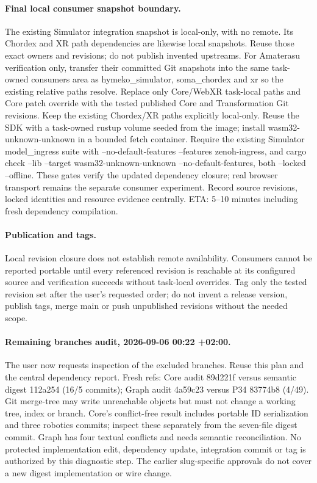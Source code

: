 \documentclass[11pt,a4paper]{article}
\begin{document}
\paragraph{Final local consumer snapshot boundary.}
The existing Simulator integration snapshot is local-only, with no remote. Its
Chordex and XR path dependencies are likewise local snapshots. Reuse those exact
owners and revisions; do not publish invented upstreams. For Amaterasu verification
only, transfer their committed Git snapshots into the same task-owned consumers
area as hymeko\_simulator, soma\_chordex and xr so the existing relative paths
resolve. Replace only Core/WebXR task-local paths and Core patch override with
the tested published Core and Transformation Git revisions. Keep the existing
Chordex/XR paths explicitly local-only. Reuse the SDK with a task-owned rustup
volume seeded from the image; install wasm32-unknown-unknown in a bounded fetch
container. Require the existing Simulator model\_ingress suite with
--no-default-features --features zenoh-ingress, and cargo check --lib --target
wasm32-unknown-unknown --no-default-features, both --locked --offline. These gates
verify the updated dependency closure; real browser transport remains the separate
consumer experiment. Record source revisions, locked identities and resource
evidence centrally. ETA: 5--10 minutes including fresh dependency compilation.
\paragraph{Publication and tags.}
Local revision closure does not establish remote availability. Consumers cannot be
reported portable until every referenced revision is reachable at its configured
source and verification succeeds without task-local overrides. Tag only the tested
revision set after the user's requested order; do not invent a release version,
publish tags, merge main or push unpublished revisions without the needed scope.
\paragraph{Remaining branches audit, 2026-09-06 00:22 +02:00.}
The user now requests inspection of the excluded branches. Reuse this plan and
the central dependency report. Fresh refs: Core audit 89d221f versus semantic
digest 112a254 (16/5 commits); Graph audit 4a59c23 versus P34 83774b8 (4/49).
Git merge-tree may write unreachable objects but must not change a working tree,
index or branch. Core's conflict-free result includes portable ID serialization
and three robotics commits; inspect these separately from the seven-file digest
commit. Graph has four textual conflicts and needs semantic reconciliation.
No protected implementation edit, dependency update, integration commit or tag
is authorized by this diagnostic step. The earlier slug-specific approvals do
not cover a new digest implementation or wire change.
\end{document}
